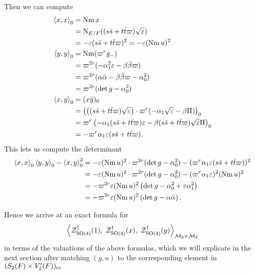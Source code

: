 Then we can compute
\begin{align*}
  \left\langle x,x \right\rangle _0 &= \operatorname{Nm} x \\
  &= \operatorname{N}_{E/F}((s \bar s + t \bar t \varpi)\sqrt{\varepsilon}) \\
  &= -\varepsilon(s \bar s + t \bar t \varpi)^2 = -\varepsilon (\operatorname{Nm} u)^2 \\
  \left\langle y,y \right\rangle _0 &= \operatorname{Nm} (\varpi^r g_-) \\
  &= \varpi^{2r} (-\alpha_1^2 \varepsilon - \beta\bar\beta \varpi) \\
  &= \varpi^{2r} (\alpha\bar\alpha - \beta\bar\beta \varpi - \alpha_0^2) \\
  &= \varpi^{2r}(\det g - \alpha_0^2) \\
  \left\langle x,y \right\rangle _0 &= (x \bar y)_0 \\
  &= \left( \left( (s \bar s + t \bar t \varpi) \sqrt{\varepsilon} \right)
    \cdot \varpi^{r} (-\alpha_1\sqrt{\varepsilon} - \beta \Pi) \right)_0 \\
  &= \varpi^r \left( -\alpha_1 (s \bar s + t \bar t \varpi) \varepsilon
    - \beta (s \bar s + t \bar t \varpi) \sqrt{\varepsilon} \Pi \right)_0 \\
  &= - \varpi^r \alpha_1 \varepsilon (s \bar s + t \bar t \varpi).
\end{align*}
This lets us compute the determinant
\begin{align*}
  \left\langle x,x \right\rangle _0 \left\langle y,y \right\rangle _0 - \left\langle x,y \right\rangle^2_0
  &= - \varepsilon (\operatorname{Nm} u)^2\cdot \varpi^{2r} (\det g - \alpha_0^2)
  - (\varpi^r \alpha_1 \varepsilon (s \bar s + t \bar t \varpi))^2 \\
  &= - \varepsilon (\operatorname{Nm} u)^2\cdot \varpi^{2r} (\det g - \alpha_0^2)
  - (\varpi^r \alpha_1 \varepsilon)^2 (\operatorname{Nm} u)^2 \\
  &= -\varpi^{2r} \varepsilon (\operatorname{Nm} u)^2  \left( \det g - \alpha_0^2 + \varepsilon \alpha_1^2 \right) \\
  &= -\varpi^{2r} \varepsilon (\operatorname{Nm} u)^2  \left( \det g - \alpha \bar\alpha \right).
\end{align*}

Hence we arrive at an exact formula for
\[ \left< \mathcal Z^{\dagger}_{\operatorname{SO}(4)}(1), \; \mathcal Z^{\dagger}_{\operatorname{SO}(4)}(x), \; \mathcal Z^{\dagger}_{\operatorname{SO}(4)}(y) \right>_{\mathcal M_2 \times \mathcal M_2} \]
in terms of the valuations of the above formulas,
which we will explicate in the next section after matching $(g,u)$
to the corresponding element in $(S_2(F) \times V_2'(F))_{\mathrm{rs}}$
